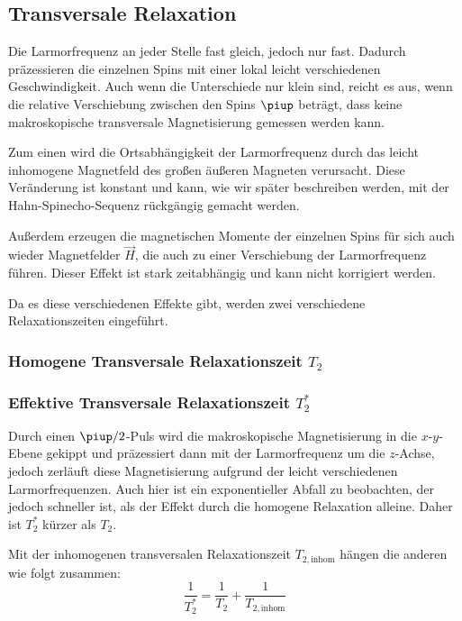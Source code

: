 \subsection{Transversale Relaxation}

Die Larmorfrequenz an jeder Stelle fast gleich, jedoch nur fast. Dadurch
präzessieren die einzelnen Spins mit einer lokal leicht verschiedenen
Geschwindigkeit. Auch wenn die Unterschiede nur klein sind, reicht es aus, wenn
die relative Verschiebung zwischen den Spins $\piup$ beträgt, dass keine
makroskopische transversale Magnetisierung gemessen werden kann.

Zum einen wird die Ortsabhängigkeit der Larmorfrequenz durch das leicht
inhomogene Magnetfeld des großen äußeren Magneten verursacht. Diese Veränderung
ist konstant und kann, wie wir später beschreiben werden, mit der
Hahn-Spinecho-Sequenz rückgängig gemacht werden.

Außerdem erzeugen die magnetischen Momente der einzelnen Spins für sich auch
wieder Magnetfelder $\vec H$, die auch zu einer Verschiebung der Larmorfrequenz
führen. Dieser Effekt ist stark zeitabhängig und kann nicht korrigiert werden.

Da es diese verschiedenen Effekte gibt, werden zwei verschiedene
Relaxationszeiten eingeführt.

\subsubsection{Homogene Transversale Relaxationszeit $T_2$}

\subsubsection{Effektive Transversale Relaxationszeit $T_2^*$}

Durch einen $\piup/2$-Puls wird die makroskopische Magnetisierung in die
$x$-$y$-Ebene gekippt und präzessiert dann mit der Larmorfrequenz um die
$z$-Achse, jedoch zerläuft diese Magnetisierung aufgrund der leicht
verschiedenen Larmorfrequenzen. Auch hier ist ein exponentieller Abfall zu
beobachten, der jedoch schneller ist, als der Effekt durch die homogene
Relaxation alleine. Daher ist $T_2^*$ kürzer als $T_2$.

Mit der inhomogenen transversalen Relaxationszeit $T_{2,\text{inhom}}$ hängen
die anderen wie folgt zusammen: \parencite[Formel~P443.5]{physik412-Anleitung}
\begin{equation}
    \label{eq:}
    \frac{1}{T_2^*} = \frac 1{T_2} + \frac{1}{T_{2,\text{inhom}}}
\end{equation}

